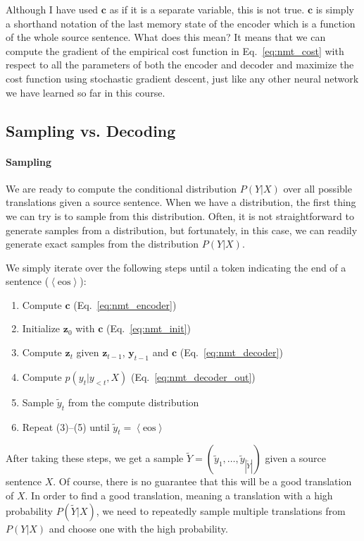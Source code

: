 \documentclass{report}
\newcommand{\vect}[1]{\mathbf{#1}}
\newcommand{\vc}[0]{\vect{c}}
\newcommand{\vz}[0]{\vect{z}}
\newcommand{\vy}[0]{\vect{y}}
\begin{document}
Although I have used $\vc$ as if it is a separate variable, this is not true.
$\vc$ is simply a shorthand notation of the last memory state of the encoder
which is a function of the whole source sentence. What does this mean? It means
that we can compute the gradient of the empirical cost function in
Eq.~\eqref{eq:nmt_cost} with respect to all the parameters of both the encoder
and decoder and maximize the cost function using stochastic gradient descent,
just like any other neural network we have learned so far in this course.

\subsection{Sampling vs. Decoding}

\paragraph{Sampling}

We are ready to compute the conditional distribution $P(Y|X)$ over all possible
translations given a source sentence. When we have a distribution, the first
thing we can try is to sample from this distribution. Often, it is not
straightforward to generate samples from a distribution, but fortunately, in
this case, we can readily generate exact samples from the distribution $P(Y|X)$. 

We simply iterate over the following steps until a token indicating the end of a
sentence ($\left< \text{eos} \right>$):
\begin{enumerate}
    \itemsep 0em
    \item Compute $\vc$ (Eq.~\eqref{eq:nmt_encoder})
    \item Initialize $\vz_0$ with $\vc$ (Eq.~\eqref{eq:nmt_init})
    \item Compute $\vz_t$ given $\vz_{t-1}$, $\vy_{t-1}$ and $\vc$
        (Eq.~\eqref{eq:nmt_decoder})
    \item Compute $p(y_t|y_{<t}, X)$ (Eq.~\eqref{eq:nmt_decoder_out})
    \item Sample $\tilde{y}_t$ from the compute distribution
    \item Repeat (3)--(5) until $\tilde{y}_t = \left< \text{eos} \right>$
\end{enumerate}

After taking these steps, we get a sample $\tilde{Y}=\left( \tilde{y}_1, \ldots,
\tilde{y}_{|\tilde{Y}|}\right)$ given a source sentence $X$. Of course, there is
no guarantee that this will be a good translation of $X$. In order to find a
good translation, meaning a translation with a high probability
$P(\tilde{Y}|X)$, we need to repeatedly sample multiple translations from
$P(Y|X)$ and choose one with the high probability.
\end{document}
